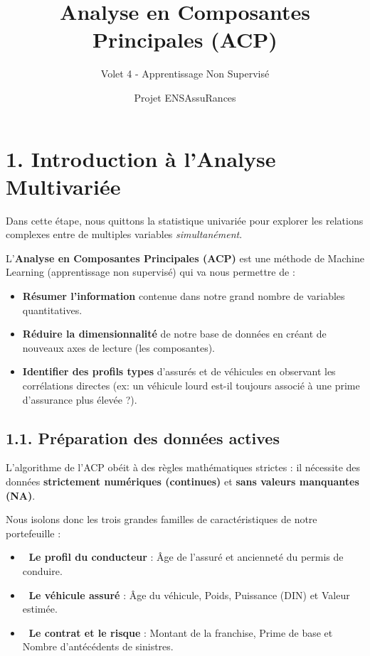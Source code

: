 \documentclass[
]{article}
\title{Analyse en Composantes Principales (ACP)}
\subtitle{Volet 4 - Apprentissage Non Supervisé}
\author{Projet ENSAssuRances}
\date{}
\providecommand{\tightlist}{%
  \setlength{\itemsep}{0pt}\setlength{\parskip}{0pt}}
\begin{document}
\maketitle

{
\setcounter{tocdepth}{3}
\tableofcontents
}
\section{1. Introduction à l'Analyse
Multivariée}\label{introduction-uxe0-lanalyse-multivariuxe9e}

Dans cette étape, nous quittons la statistique univariée pour explorer
les relations complexes entre de multiples variables
\emph{simultanément}.

L'\textbf{Analyse en Composantes Principales (ACP)} est une méthode de
Machine Learning (apprentissage non supervisé) qui va nous permettre de
:

\begin{itemize}
\tightlist
\item
  \textbf{Résumer l'information} contenue dans notre grand nombre de
  variables quantitatives.
\item
  \textbf{Réduire la dimensionnalité} de notre base de données en créant
  de nouveaux axes de lecture (les composantes).
\item
  \textbf{Identifier des profils types} d'assurés et de véhicules en
  observant les corrélations directes (ex: un véhicule lourd est-il
  toujours associé à une prime d'assurance plus élevée ?).
\end{itemize}

\subsection{1.1. Préparation des données
actives}\label{pruxe9paration-des-donnuxe9es-actives}

L'algorithme de l'ACP obéit à des règles mathématiques strictes : il
nécessite des données \textbf{strictement numériques (continues)} et
\textbf{sans valeurs manquantes (NA)}.

Nous isolons donc les trois grandes familles de caractéristiques de
notre portefeuille :

\begin{itemize}
\tightlist
\item
  👤 \textbf{Le profil du conducteur} : Âge de l'assuré et ancienneté du
  permis de conduire.
\item
  🚗 \textbf{Le véhicule assuré} : Âge du véhicule, Poids, Puissance
  (DIN) et Valeur estimée.
\item
  📄 \textbf{Le contrat et le risque} : Montant de la franchise, Prime
  de base et Nombre d'antécédents de sinistres.
\end{itemize}
\end{document}
